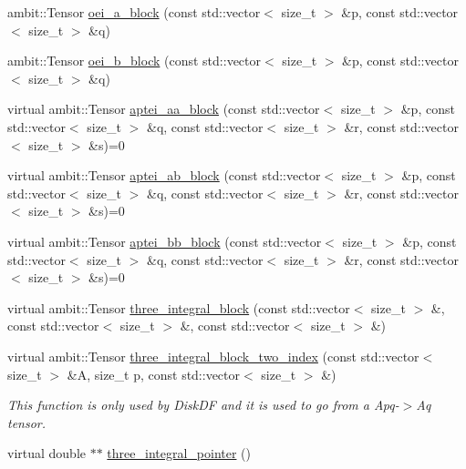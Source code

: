 \begin{DoxyCompactItemize}
ambit\+::\+Tensor \mbox{\hyperlink{classforte_1_1_forte_integrals_a0e01f8b4de06ec9eb2cd79ebb375da08}{oei\+\_\+a\+\_\+block}} (const std\+::vector$<$ size\+\_\+t $>$ \&p, const std\+::vector$<$ size\+\_\+t $>$ \&q)
\item 
ambit\+::\+Tensor \mbox{\hyperlink{classforte_1_1_forte_integrals_af49cebc262b53e87620b23a70b167fb6}{oei\+\_\+b\+\_\+block}} (const std\+::vector$<$ size\+\_\+t $>$ \&p, const std\+::vector$<$ size\+\_\+t $>$ \&q)
\item 
virtual ambit\+::\+Tensor \mbox{\hyperlink{classforte_1_1_forte_integrals_ac20ae649b8cfe116f8583d676e43da27}{aptei\+\_\+aa\+\_\+block}} (const std\+::vector$<$ size\+\_\+t $>$ \&p, const std\+::vector$<$ size\+\_\+t $>$ \&q, const std\+::vector$<$ size\+\_\+t $>$ \&r, const std\+::vector$<$ size\+\_\+t $>$ \&s)=0
\item 
virtual ambit\+::\+Tensor \mbox{\hyperlink{classforte_1_1_forte_integrals_acd40e350dc861baf8adf6a3b47c74023}{aptei\+\_\+ab\+\_\+block}} (const std\+::vector$<$ size\+\_\+t $>$ \&p, const std\+::vector$<$ size\+\_\+t $>$ \&q, const std\+::vector$<$ size\+\_\+t $>$ \&r, const std\+::vector$<$ size\+\_\+t $>$ \&s)=0
\item 
virtual ambit\+::\+Tensor \mbox{\hyperlink{classforte_1_1_forte_integrals_ae2799dc7cbfd456603a2b841b26582ab}{aptei\+\_\+bb\+\_\+block}} (const std\+::vector$<$ size\+\_\+t $>$ \&p, const std\+::vector$<$ size\+\_\+t $>$ \&q, const std\+::vector$<$ size\+\_\+t $>$ \&r, const std\+::vector$<$ size\+\_\+t $>$ \&s)=0
\item 
virtual ambit\+::\+Tensor \mbox{\hyperlink{classforte_1_1_forte_integrals_aa1d259ae97b5a9c96ccb20599543b126}{three\+\_\+integral\+\_\+block}} (const std\+::vector$<$ size\+\_\+t $>$ \&, const std\+::vector$<$ size\+\_\+t $>$ \&, const std\+::vector$<$ size\+\_\+t $>$ \&)
\item 
virtual ambit\+::\+Tensor \mbox{\hyperlink{classforte_1_1_forte_integrals_aab51824020dc3588c026b5b7740f55a9}{three\+\_\+integral\+\_\+block\+\_\+two\+\_\+index}} (const std\+::vector$<$ size\+\_\+t $>$ \&A, size\+\_\+t p, const std\+::vector$<$ size\+\_\+t $>$ \&)
\begin{DoxyCompactList}\small\item\em This function is only used by Disk\+DF and it is used to go from a Apq-\/$>$Aq tensor. \end{DoxyCompactList}\item 
virtual double $\ast$$\ast$ \mbox{\hyperlink{classforte_1_1_forte_integrals_a69292bc8e42a76e344cd01c4e3dd48d5}{three\+\_\+integral\+\_\+pointer}} ()
$$
\end{DoxyCompactItemize}
